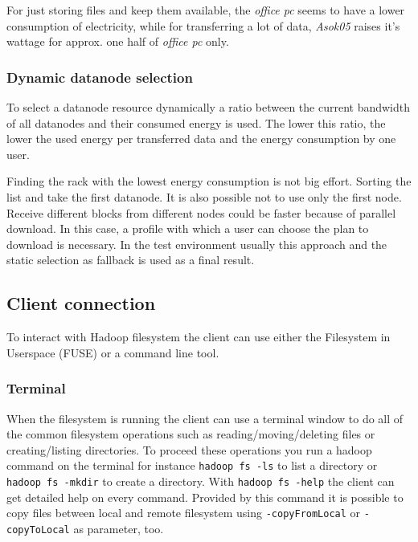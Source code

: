 For just storing files and keep them available, the \textit{office pc} seems to have a lower consumption of electricity, while for transferring a lot of data, \textit{Asok05} raises it's wattage for approx. one half of \textit{office pc} only.

\subsubsection{Dynamic datanode selection}

To select a datanode resource dynamically a ratio between the current bandwidth of all datanodes and their consumed energy is used. The lower this ratio, the lower the used energy per transferred data and the energy consumption by one user.

Finding the rack with the lowest energy consumption is not big effort. Sorting the list and take the first datanode. It is also possible not to use only the first node. Receive different blocks from different nodes could be faster because of parallel download. In this case, a profile with which a user can choose the plan to download is necessary. In the test environment usually this approach and the static selection as fallback is used as a final result.

\subsection{Client connection}
\label{sec:hdfs_client}

To interact with Hadoop filesystem the client can use either the Filesystem in Userspace (FUSE) or a command line tool.

\subsubsection{Terminal}

When the filesystem is running the client can use a terminal window to do all of the common filesystem operations such as reading/moving/deleting files or creating/listing directories. To proceed these operations you run a hadoop command on the terminal for instance \texttt{hadoop fs -ls} to list a directory or \texttt{hadoop fs -mkdir} to create a directory. With \texttt{hadoop fs -help} the client can get detailed help on every command. 
Provided by this command it is possible to copy files between local and remote filesystem using \texttt{-copyFromLocal} or \texttt{-copyToLocal} as parameter, too.

